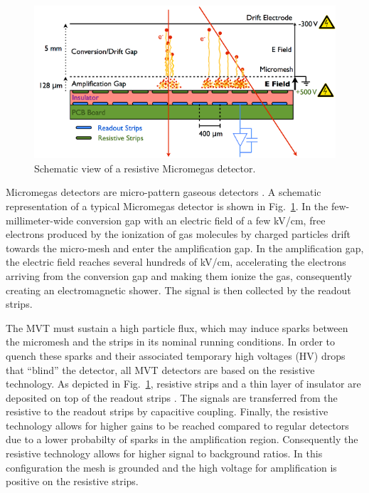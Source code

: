 \begin{figure}[!thb]
\begin{center}
\includegraphics[width=1.8\columnwidth,keepaspectratio]{images/mm_principle}
\end{center}

\caption{Schematic view of a resistive Micromegas detector.}
\label{fig:mm-principle}
\end{figure}

Micromegas detectors are micro-pattern gaseous detectors \cite{GIOMATARIS199629}. A schematic representation of a
typical Micromegas detector is shown in Fig.~\ref{fig:mm-principle}. In the few-millimeter-wide conversion gap with an
electric field of a few kV/cm, free electrons produced by the ionization of gas molecules by charged particles drift towards
the micro-mesh and enter the amplification gap. In the amplification gap, the electric field reaches several hundreds of
kV/cm, accelerating the electrons arriving from the conversion gap and making them ionize the gas, consequently creating an
electromagnetic shower. The signal is then collected by the readout strips.  


The MVT must sustain a high particle flux, which may induce sparks between the micromesh and the strips in its nominal
running conditions. In order to quench these sparks and their associated temporary high voltages (HV) drops that ``blind''
the detector, all MVT detectors are based on the resistive technology. As depicted in Fig.~\ref{fig:mm-principle}, resistive
strips and a thin layer of insulator are deposited on top of the readout strips \cite{ALEXOPOULOS2011110}. The signals are
transferred from the resistive to the readout strips by capacitive coupling. Finally, the resistive technology allows for higher
gains to be reached compared to regular detectors due to a lower probabilty of sparks in the amplification region. Consequently the resistive technology allows for higher signal to background ratios. In this
configuration the mesh is grounded and the high voltage for amplification is positive on the resistive strips. 

